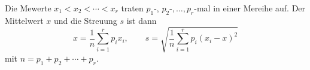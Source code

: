 \documentclass{article}
\begin{document}
Die Me\3werte $x_1 < x_2 < \cdots < x_r$ traten $p_1$-, $p_2$-$,\ldots,p_r$-mal
in einer Me\3reihe auf. Der Mittelwert $x$ und die Streuung $s$ ist dann
\[ x = \frac{1}{n}\sum_{i=1}^r p_i x_i,\qquad s= \sqrt{\frac{1}{n}\sum_{i=1}^r
   p_i(x_i - x)^2} \]
mit $ n = p_1 + p_2 +\cdots+p_r $.
\end{document}
